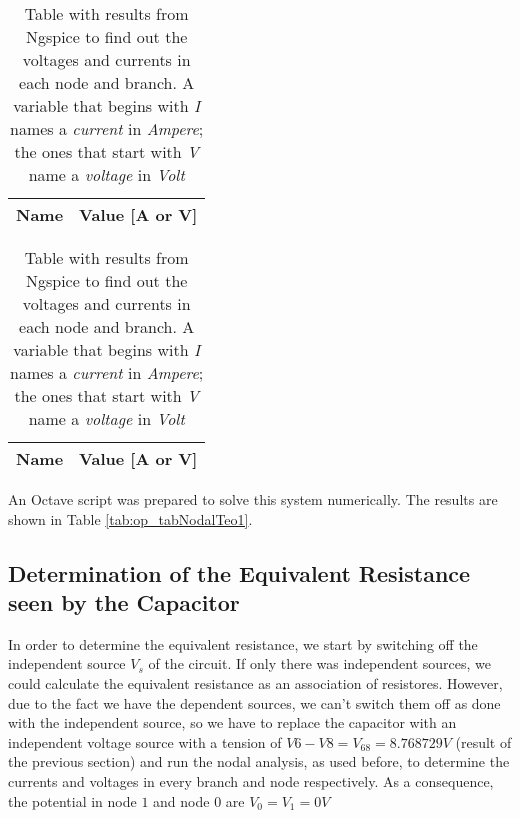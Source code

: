 \hfill

\begin{table}
  \parbox{.45\linewidth}{
    \centering
    \begin{tabular}{|c|c|}
      \hline
      {\bf Name} & {\bf Value [A or V]} \\ \hline
      
    \end{tabular}
    \label{tab:op_tabNodalTeo1}
    \caption{Results of Nodal Analysis of the circuit for t < 0. A variable that begins  with \textit{I} names a \textit{current} in \textit{Ampere}; the ones that start with \textit{V} name a \textit{voltage} in \textit{Volt}}
  }
  \hfill
  \parbox{.45\linewidth}{
    \centering
    \begin{tabular}{|c|c|}
      {\bf Name} & {\bf Value [A or V]} \\ \hline
      
      \hline
    \end{tabular}
    \label{tab:op_tabNodalSpice1}
    \caption{Table with results from Ngspice to find out the voltages and currents in each node and branch. A variable that begins  with \textit{I} names a \textit{current} in \textit{Ampere}; the ones that start with \textit{V} name a \textit{voltage} in \textit{Volt} }
  }
\end{table}



An Octave script was prepared to solve this system numerically. The results are shown in Table \ref{tab:op_tabNodalTeo1}.




\subsection{Determination of the Equivalent Resistance seen by the Capacitor}

In order to determine the equivalent resistance, we start by switching off the independent source $V_s$ of the circuit. If only there was independent sources, we could calculate the equivalent resistance
as an association of resistores. However, due to the fact we have the dependent sources, we can't switch them off as done with the independent source, so we have to replace the capacitor with an independent voltage source with a tension of $V6-V8 = V_{68} = 8.768729 V$ (result of the previous section)
and run the nodal analysis, as used before,
to determine the currents and voltages in every branch and node respectively. As a consequence, the potential in node $1$ and node $0$ are $V_0 = V_1 = 0 V$

